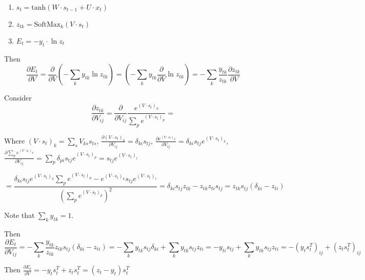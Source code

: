 \documentclass[a4paper]{article}
\title{}
\date{}
\author{Sergei Volodin}
\begin{document}
\maketitle
\begin{enumerate}
\item $s_t = \mbox{tanh}(W\cdot s_{t-1}+U\cdot x_t)$
\item $z_{tk}=\mbox{SoftMax}_k(V\cdot s_t)$
\item $E_t=-y_t\cdot\ln z_t$
\end{enumerate}
Then
$$\frac{\partial E_t}{\partial V}=\frac{\partial }{\partial V}(-\sum\limits_k y_{tk}\ln z_{tk})=(-\sum\limits_k y_{tk}\frac{\partial }{\partial V}\ln z_{tk})=-\sum\limits_k \frac{y_{tk}}{z_{tk}}\frac{\partial z_{tk}}{\partial V}$$


Consider
$$\frac{\partial z_{tk}}{\partial V_{ij}}=\frac{\partial}{\partial V_{ij}}\frac{e^{(V\cdot s_t)_k}}{\sum\limits_p e^{(V\cdot s_t)_p}}\boxed{=}$$

Where $(V\cdot s_t)_k=\sum\limits_s V_{ks}s_{ts}$, $\frac{\partial (V\cdot s_t)_k}{\partial V_{ij}}=\delta_{ki}s_{tj}$, $\frac{\partial e^{(V\cdot s_t)_k}}{\partial V_{ij}}=\delta_{ki}s_{tj}e^{(V\cdot s_t)_k}$, $\frac{\partial \sum\limits_p e^{(V\cdot s_t)_p}}{\partial V_{ij}}=\sum\limits_p \delta_{pi}s_{tj}e^{(V\cdot s_t)_p}=s_{tj}e^{(V\cdot s_t)_i}$


$$\boxed{=}\frac{\delta_{ki}s_{tj}e^{(V\cdot s_t)_k}\sum\limits_p e^{(V\cdot s_t)_p}-e^{(V\cdot s_t)_k}s_{tj}e^{(V\cdot s_t)_i}}{(\sum\limits_p e^{(V\cdot s_t)_p})^2}=\delta_{ki}s_{tj}z_{tk}-z_{tk}z_{ti}s_{tj}=z_{tk}s_{tj}(\delta_{ki}-z_{ti})$$

Note that $\sum\limits_k y_{tk}=1$.

Then $$\frac{\partial E_t}{\partial V_{ij}}=-\sum\limits_k \frac{y_{tk}}{z_{tk}}z_{tk}s_{tj}(\delta_{ki}-z_{ti})=-\sum\limits_k y_{tk}s_{tj}\delta_{ki}+\sum\limits_k y_{tk}s_{tj}z_{ti}=-y_{ti}s_{tj}+\sum\limits_k y_{tk} s_{tj}z_{ti}=-(y_ts_t^T)_{ij}+(z_ts_t^T)_{ij}$$

Then $\frac{\partial E_t}{\partial V}=-y_ts_t^T+z_ts_t^T=\boxed{(z_t-y_t)s_t^T}$
\end{document}
